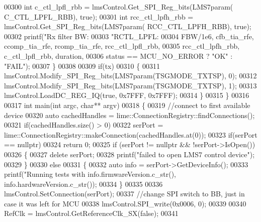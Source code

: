 \begin{DoxyCode}
{{{00300         \textcolor{keywordtype}{int} c\_ctl\_lpfl\_rbb = lmsControl.Get_SPI_Reg_bits(LMS7param(
      C_CTL_LPFL_RBB), \textcolor{keyword}{true});
00301         \textcolor{keywordtype}{int} rcc\_ctl\_lpfh\_rbb = lmsControl.Get_SPI_Reg_bits(LMS7param(
      RCC_CTL_LPFH_RBB), \textcolor{keyword}{true});
00302         printf(\textcolor{stringliteral}{"Rx filter BW: %
00303             \textcolor{stringliteral}{"RCTL\_LPFL: %
00304             FBW/1e6, cfb\_tia\_rfe, ccomp\_tia\_rfe, rcomp\_tia\_rfe, rcc\_ctl\_lpfl\_rbb,
00305             rcc\_ctl\_lpfh\_rbb, c\_ctl\_lpfl\_rbb, duration,
00306             status == MCU_NO_ERROR ? \textcolor{stringliteral}{"OK"} : \textcolor{stringliteral}{"FAIL"});
00307     \}
00308 
00309     \textcolor{keywordflow}{if}(tx)
00310     \{
00311         lmsControl.Modify_SPI_Reg_bits(LMS7param(TSGMODE_TXTSP), 0);
00312         lmsControl.Modify_SPI_Reg_bits(LMS7param(TSGMODE_TXTSP), 1);
00313         lmsControl.LoadDC_REG_IQ(\textcolor{keyword}{true}, 0x7FFF, 0x7FFF);
00314     \}
00315 \}
00316 
00317 \textcolor{keywordtype}{int} main(\textcolor{keywordtype}{int} argc, \textcolor{keywordtype}{char}** argv)
00318 \{
00319     \textcolor{comment}{//connect to first available device}
00320     \textcolor{keyword}{auto} cachedHandles = lime::ConnectionRegistry::findConnections();
00321     \textcolor{keywordflow}{if}(cachedHandles.size() > 0)
00322         serPort = lime::ConnectionRegistry::makeConnection(cachedHandles.at(0));
00323     \textcolor{keywordflow}{if}(serPort == \textcolor{keyword}{nullptr})
00324         \textcolor{keywordflow}{return} 0;
00325     \textcolor{keywordflow}{if} (serPort != \textcolor{keyword}{nullptr} && !serPort->IsOpen())
00326     \{
00327         \textcolor{keyword}{delete} serPort;
00328         printf(\textcolor{stringliteral}{"failed to open LMS7 control device"});
00329     \}
00330     \textcolor{keywordflow}{else}
00331     \{
00332         \textcolor{keyword}{auto} info = serPort->GetDeviceInfo();
00333         printf(\textcolor{stringliteral}{"Running tests with %
      info.firmwareVersion.c\_str(), info.hardwareVersion.c\_str());
00334     \}
00335 
00336     lmsControl.SetConnection(serPort);
00337     \textcolor{comment}{//change SPI switch to BB, just in case it was left for MCU}
00338     lmsControl.SPI_write(0x0006, 0);
00339 
00340     RefClk = lmsControl.GetReferenceClk_SX(\textcolor{keyword}{false});
00341 
}}}}}}
\end{DoxyCode}
